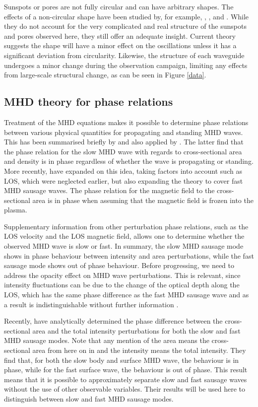 	Sunspots or pores are not fully circular and can have arbitrary shapes.
	The effects of a non-circular shape have been studied by, for example, \citet{2003A&A...409..287R}, \citet{2009A&A...502..315M}, and \citet{2011A&A...527A..53M}.
	While they do not account for the very complicated and real structure of the sunspots and pores observed here, they still offer an adequate insight.
	Current theory suggests the shape will have a minor effect on the oscillations unless it has a significant deviation from circularity.
	Likewise, the structure of each waveguide undergoes a minor change during the observation campaign, limiting any effects from large-scale structural change, as can be seen in Figure \ref{data}.

\subsection{MHD theory for phase relations}
	
	Treatment of the MHD equations makes it possible to determine phase relations between various physical quantities for propagating and standing MHD waves.
	This has been summarised briefly by \citet{goedbloed} and also applied by \citet{PMHDW}.
	The latter find that the phase relation for the slow MHD wave with regards to cross-sectional area and density is in phase regardless of whether the wave is propagating or standing.
	More recently, \citet{Moreels2013} have expanded on this idea, taking factors into account such as LOS, which were neglected earlier, but also expanding the theory to cover fast MHD sausage waves.
	The phase relation for the magnetic field to the cross-sectional area is in phase when assuming that the magnetic field is frozen into the plasma.
	
	Supplementary information from other perturbation phase relations, such as the LOS velocity and the LOS magnetic field, allows one to determine whether the observed MHD wave is slow or fast.
	In summary, the slow MHD sausage mode shows in phase behaviour between intensity and area perturbations, while the fast sausage mode shows out of phase behaviour.
	Before progressing, we need to address the opacity effect on MHD wave perturbations.
	This is relevant, since intensity fluctuations can be due to the change of the optical depth along the LOS, which has the same phase difference as the fast MHD sausage wave and as a result is indistinguishable without further information \citep{PMHDW}.
	
	Recently, \citet{Moreels2013b} have analytically determined the phase difference between the cross-sectional area and the total intensity perturbations for both the slow and fast MHD sausage modes.
	Note that any mention of the area means the cross-sectional area from here on in and the intensity means the total intensity.
	They find that, for both the slow body and surface MHD wave, the behaviour is in phase, while for the fast surface wave, the behaviour is out of phase.
	This result means that it is possible to approximately separate slow and fast sausage waves without the use of other observable variables. Their results will be used here to distinguish between slow and fast MHD sausage modes.

